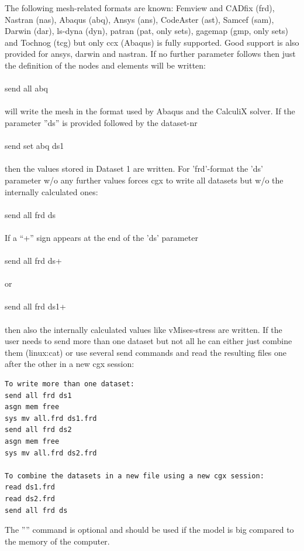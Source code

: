 \documentclass{article}
\begin{document}
The following mesh-related formats are known: Femview and CADfix (frd), Nastran (nas), Abaqus (abq), Ansys (ans), CodeAster (ast), Samcef (sam), Darwin (dar), ls-dyna (dyn), patran (pat, only sets), gagemap (gmp, only sets) and Tochnog (tcg) but only ccx (Abaqus) is fully supported. Good support is also provided for ansys, darwin and nastran. If no further parameter follows then just the definition of the nodes and elements will be written:\\\\send all abq\\\\will write the mesh in the format used by Abaqus and the CalculiX solver. If the parameter ''ds'' is provided followed by the dataset-nr\\\\send set abq ds1\\\\then the values stored in Dataset 1 are written. For 'frd'-format the 'ds' parameter w/o any further values forces cgx to write all datasets but w/o the internally calculated ones:\\\\send all frd ds\\\\If a ``+'' sign appears at the end of the 'ds' parameter\\\\send all frd ds+\\\\or \\\\send all frd ds1+\\\\then also the internally calculated values like vMises-stress are written. If the user needs to send more than one dataset but not all he can either just combine them (linux:cat) or use several send commands and read the resulting files one after the other in a new cgx session:
\begin{verbatim}
To write more than one dataset:
send all frd ds1
asgn mem free
sys mv all.frd ds1.frd
send all frd ds2
asgn mem free
sys mv all.frd ds2.frd

To combine the datasets in a new file using a new cgx session:
read ds1.frd
read ds2.frd
send all frd ds
\end{verbatim}
The '''' command is optional and should be used if the model is big compared to the memory of the computer.
\end{document}
